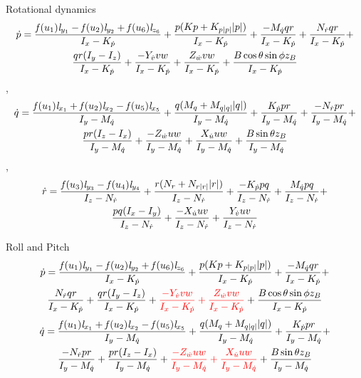 \documentclass[11pt]{beamer}
\begin{document}
\begin{frame}[shrink]{Rotational dynamics}
\begin{multline} \label{eq:p_dot}
\dot{p} = \frac{\mathit{f}(u_{1}) \mathit{l}_{y_{1}} - \mathit{f}(u_{2}) \mathit{l}_{y_{2}} + \mathit{f}(u_{6}) \mathit{l}_{z_{6}}}{I_{x} - K_{\dot{p}}} + \frac{p (Kp + K_{p|p|} |p|)}{I_{x} - K_{\dot{p}}} + \frac{-M_{\dot{q}} q r}{I_{x} - K_{\dot{p}}} + \frac{N_{\dot{r}} q r}{I_{x} - K_{\dot{p}}} +\\
\frac{q r (I_{y} - I_{z})}{I_{x} - K_{\dot{p}}} + \frac{- Y_{\dot{v}} v w}{I_{x} - K_{\dot{p}}} + \frac{Z_{\dot{w}} v w}{I_{x} - K_{\dot{p}}} + \frac{B \cos{\theta} \sin{\phi} z_B}{I_{x} - K_{\dot{p}}}
\end{multline},
\begin{multline} \label{eq:q_dot}
\dot{q} =\frac{\mathit{f}(u_{1}) \mathit{l}_{x_{1}} + \mathit{f}(u_{2}) \mathit{l}_{x_{2}} - \mathit{f}(u_{5}) \mathit{l}_{x_{5}}}{I_{y} - M_{\dot{q}}} + \frac{q (M_{q} + M_{q|q|} |q|)}{I_{y} - M_{\dot{q}}} + \frac{K_{\dot{p}} p r}{I_{y} - M_{\dot{q}}} + \frac{-N_{\dot{r}} p r}{I_{y} - M_{\dot{q}}} +\\
\frac{p r (I_{z} - I_{x})}{I_{y} - M_{\dot{q}}} + \frac{-Z_{\dot{w}} u w}{I_{y} - M_{\dot{q}}} + \frac{X_{\dot{u}} u w}{I_{y} - M_{\dot{q}}} + \frac{B \sin{\theta} z_B}{I_{y} - M_{\dot{q}}} 
\end{multline},
\begin{multline} \label{eq:r_dot}
\dot{r} = \frac{\mathit{f}(u_{3}) \mathit{l}_{y_{3}} - \mathit{f}(u_{4}) \mathit{l}_{y_{4}}}{I_{z} - N_{\dot{r}}} + \frac{r (N_{r} + N_{r|r|} |r|)}{I_{z} - N_{\dot{r}}} + \frac{-K_{\dot{p}} p q}{I_{z} - N_{\dot{r}}} + \frac{M_{\dot{q}} p q}{I_{z} - N_{\dot{r}}} +\\
\frac{p q (I_{x} - I_{y})}{I_{z} - N_{\dot{r}}} + \frac{- X_{\dot{u}} u v}{I_{z} - N_{\dot{r}}} + \frac{Y_{\dot{v}} u v}{I_{z} - N_{\dot{r}}}
\end{multline} 
\end{frame}

\begin{frame}[shrink]{Roll and Pitch}
\begin{multline*}
\dot{p} = \frac{\mathit{f}(u_{1}) \mathit{l}_{y_{1}} - \mathit{f}(u_{2}) \mathit{l}_{y_{2}} + \mathit{f}(u_{6}) \mathit{l}_{z_{6}}}{I_{x} - K_{\dot{p}}} + \frac{p (Kp + K_{p|p|} |p|)}{I_{x} - K_{\dot{p}}} + \frac{-M_{\dot{q}} q r}{I_{x} - K_{\dot{p}}} + \\ \frac{N_{\dot{r}} q r}{I_{x} - K_{\dot{p}}} + \frac{q r (I_{y} - I_{z})}{I_{x} - K_{\dot{p}}} + \textcolor{red}{\frac{- Y_{\dot{v}} v w}{I_{x} - K_{\dot{p}}} + \frac{Z_{\dot{w}} v w}{I_{x} - K_{\dot{p}}}} + \frac{B \cos{\theta} \sin{\phi} z_B}{I_{x} - K_{\dot{p}}}
\end{multline*}
\begin{multline*}
\dot{q} =\frac{\mathit{f}(u_{1}) \mathit{l}_{x_{1}} + \mathit{f}(u_{2}) \mathit{l}_{x_{2}} - \mathit{f}(u_{5}) \mathit{l}_{x_{5}}}{I_{y} - M_{\dot{q}}} + \frac{q (M_{q} + M_{q|q|} |q|)}{I_{y} - M_{\dot{q}}} + \frac{K_{\dot{p}} p r}{I_{y} - M_{\dot{q}}} +\\ \frac{-N_{\dot{r}} p r}{I_{y} - M_{\dot{q}}} + \frac{p r (I_{z} - I_{x})}{I_{y} - M_{\dot{q}}} + \textcolor{red}{\frac{-Z_{\dot{w}} u w}{I_{y} - M_{\dot{q}}} + \frac{X_{\dot{u}} u w}{I_{y} - M_{\dot{q}}}} + \frac{B \sin{\theta} z_B}{I_{y} - M_{\dot{q}}} 
\end{multline*}
\end{frame}
\end{document}
